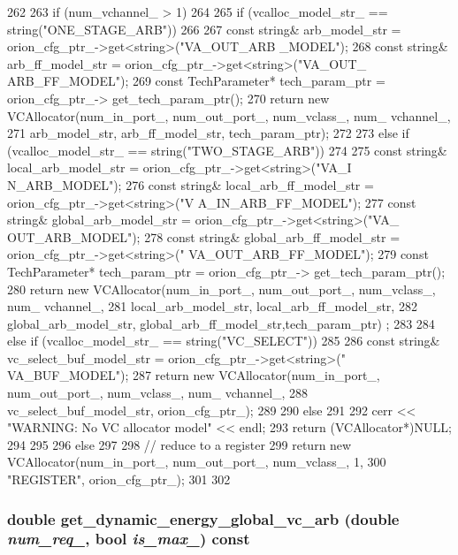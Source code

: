 \begin{DoxyCode}
262 {
263     if (num_vchannel_ > 1)
264     {
265         if (vcalloc_model_str_ == string("ONE_STAGE_ARB"))
266         {
267             const string& arb_model_str = orion_cfg_ptr_->get<string>("VA_OUT_ARB
      _MODEL");
268             const string& arb_ff_model_str = orion_cfg_ptr_->get<string>("VA_OUT_
      ARB_FF_MODEL");
269             const TechParameter* tech_param_ptr = orion_cfg_ptr_->
      get_tech_param_ptr();
270             return new VCAllocator(num_in_port_, num_out_port_, num_vclass_, num_
      vchannel_, 
271                     arb_model_str, arb_ff_model_str, tech_param_ptr);
272         }
273         else if (vcalloc_model_str_ == string("TWO_STAGE_ARB"))
274         {
275             const string& local_arb_model_str = orion_cfg_ptr_->get<string>("VA_I
      N_ARB_MODEL");
276             const string& local_arb_ff_model_str = orion_cfg_ptr_->get<string>("V
      A_IN_ARB_FF_MODEL");
277             const string& global_arb_model_str = orion_cfg_ptr_->get<string>("VA_
      OUT_ARB_MODEL");
278             const string& global_arb_ff_model_str = orion_cfg_ptr_->get<string>("
      VA_OUT_ARB_FF_MODEL");
279             const TechParameter* tech_param_ptr = orion_cfg_ptr_->
      get_tech_param_ptr();
280             return new VCAllocator(num_in_port_, num_out_port_, num_vclass_, num_
      vchannel_, 
281                     local_arb_model_str, local_arb_ff_model_str, 
282                     global_arb_model_str, global_arb_ff_model_str,tech_param_ptr)
      ;
283         }
284         else if (vcalloc_model_str_ == string("VC_SELECT"))
285         {
286             const string& vc_select_buf_model_str = orion_cfg_ptr_->get<string>("
      VA_BUF_MODEL");
287             return new VCAllocator(num_in_port_, num_out_port_, num_vclass_, num_
      vchannel_,
288                     vc_select_buf_model_str, orion_cfg_ptr_);
289         }
290         else
291         {
292             cerr << "WARNING: No VC allocator model" << endl;
293             return (VCAllocator*)NULL;
294         }
295     }
296     else
297     {
298         // reduce to a register
299         return new VCAllocator(num_in_port_, num_out_port_, num_vclass_, 1,
300                 "REGISTER", orion_cfg_ptr_);
301     }
302 }
\end{DoxyCode}
\hypertarget{classVCAllocator_a3df740a0f60313b241b2570396aa8e75}{
\subsubsection[{get\_\-dynamic\_\-energy\_\-global\_\-vc\_\-arb}]{\setlength{\rightskip}{0pt plus 5cm}double get\_\-dynamic\_\-energy\_\-global\_\-vc\_\-arb (double {\em num\_\-req\_\-}, \/  bool {\em is\_\-max\_\-}) const}}
\label{classVCAllocator_a3df740a0f60313b241b2570396aa8e75}



